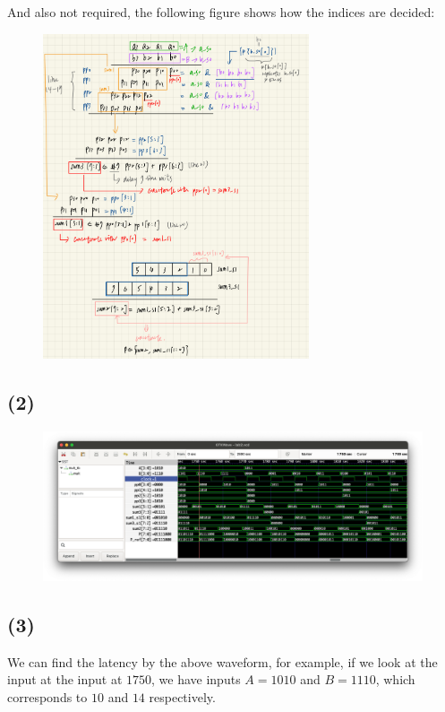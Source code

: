 \documentclass{article}
\begin{document}
And also not required, the following figure shows how the indices are decided:

\begin{figure}[H]
    \centering
    \includegraphics[width=0.7\textwidth]{4_1_design_process.jpeg}
\end{figure}

\subsection*{(2)}

\begin{figure}[H]
    \centering
    \includegraphics[width=\textwidth]{4_2.png}
\end{figure}

\subsection*{(3)}

We can find the latency by the above waveform, for example, 
if we look at the input at the input at $1750$, we have inputs $A = 1010$ and $B = 1110$, 
which corresponds to $10$ and $14$ respectively.
\bigskip
\end{document}
